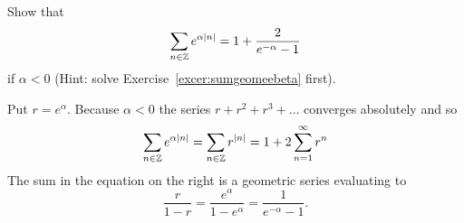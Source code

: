 \begin{excersizelist}



\item \label{excer:sumgeomeabsn} Show that 
\[
\sum_{n \in {\mathbb Z}} e^{\alpha \vert n \vert} = 1 + \frac{2}{e^{-\alpha} - 1}
\]
if $\alpha < 0$ (Hint: solve Exercise~\ref{excer:sumgeomeebeta} first).
\begin{solution}
Put $r = e^\alpha$.  Because $\alpha < 0$ the series $r + r^2 + r^3 + \dots$ converges absolutely and so
\[
\sum_{n \in {\mathbb Z}} e^{\alpha \vert n \vert} = \sum_{n \in {\mathbb Z}} r^{\left\vert n \right\vert} = 1 + 2 \sum_{n=1}^\infty r^n 
\]
The sum in the equation on the right is a geometric series evaluating to
\[
\frac{r}{1-r} = \frac{e^\alpha}{1-e^\alpha} = \frac{1}{e^{-\alpha}-1}. 
\]
\end{solution}



\end{excersizelist}
